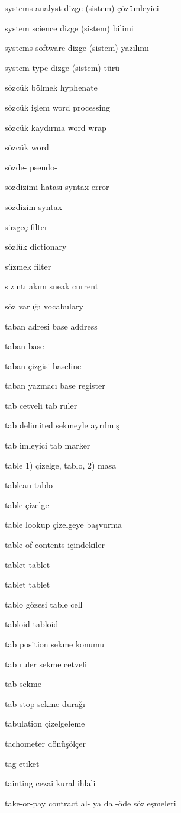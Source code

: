 \documentclass[12pt,fleqn]{article}\usepackage{../../common}
\begin{document}
systems analyst dizge (sistem) çözümleyici

system science dizge (sistem) bilimi

systems software dizge (sistem) yazılımı

system type dizge (sistem) türü

sözcük bölmek hyphenate

sözcük işlem word processing

sözcük kaydırma word wrap

sözcük word

sözde- pseudo-

sözdizimi hatası syntax error

sözdizim syntax

süzgeç filter

sözlük dictionary

süzmek filter

sızıntı akım sneak current

söz varlığı vocabulary

taban adresi base address

taban base

taban çizgisi baseline

taban yazmacı base register

tab cetveli tab ruler

tab delimited sekmeyle ayrılmış

tab imleyici tab marker

table 1) çizelge, tablo, 2) masa

tableau tablo

table çizelge

table lookup çizelgeye başvurma

table of contents içindekiler

tablet tablet

tablet tablet

tablo gözesi table cell

tabloid tabloid

tab position sekme konumu

tab ruler sekme cetveli

tab sekme

tab stop sekme durağı

tabulation çizelgeleme

tachometer dönüşölçer

tag etiket

tainting cezai kural ihlali

take-or-pay contract al- ya da -öde sözleşmeleri
\end{document}
